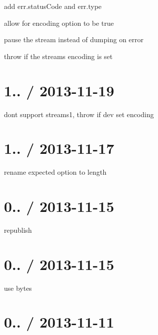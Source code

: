 \begin{DoxyItemize}
\item add err.\+status\+Code and err.\+type
\item allow for encoding option to be true
\item pause the stream instead of dumping on error
\item throw if the stream\textquotesingle{}s encoding is set
\end{DoxyItemize}

\section*{1.. / 2013-\/11-\/19 }


\begin{DoxyItemize}
\item dont support streams1, throw if dev set encoding
\end{DoxyItemize}

\section*{1.. / 2013-\/11-\/17 }


\begin{DoxyItemize}
\item rename {\ttfamily expected} option to {\ttfamily length}
\end{DoxyItemize}

\section*{0.. / 2013-\/11-\/15 }


\begin{DoxyItemize}
\item republish
\end{DoxyItemize}

\section*{0.. / 2013-\/11-\/15 }


\begin{DoxyItemize}
\item use bytes
\end{DoxyItemize}

\section*{0.. / 2013-\/11-\/11 }


